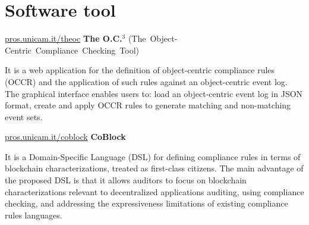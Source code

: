 \section{Software tool}
    
    \begin{twocolentry}{\href{https://pros.unicam.it/theoc/}{pros.unicam.it/theoc}}
        \textbf{The O.C.$^3$} \mbox{(The Object-Centric Compliance Checking Tool)} 
    \end{twocolentry}  

    \begin{onecolentry}
        It is a web application for the definition of object-centric compliance rules (OCCR) and the application of such rules against an object-centric event log.
        The graphical interface enables users to: load an object-centric event log in JSON format, create and apply OCCR rules to generate matching and non-matching event sets.
    \end{onecolentry}
    
    \abitspace

    \begin{twocolentry}{\href{https://pros.unicam.it/coblock/}{pros.unicam.it/coblock}}
        \textbf{CoBlock} 
    \end{twocolentry}  
    
    \begin{onecolentry}
        It is a Domain-Specific Language (DSL) for defining compliance rules in terms of blockchain characterizations, treated as first-class citizens. The main advantage of the proposed DSL is that it allows auditors to focus on blockchain characterizations relevant to decentralized applications auditing, using compliance checking, and addressing the expressiveness limitations of existing compliance rules languages.
    \end{onecolentry}